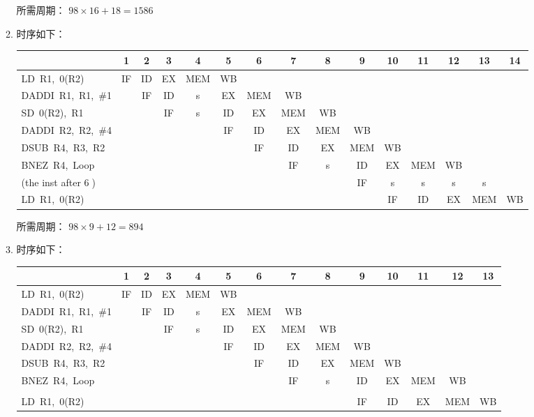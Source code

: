 \documentclass{article}
\begin{document}
\begin{enumerate}[label=\arabic*.]
\begin{enumerate}[label=\alph*.]
            所需周期： $98 \times 16 + 18 = 1586$
            \item 时序如下：\\
            \scalebox{0.8}
            {
                \begin{tabular}{lcccccccccccccc}
                    \hline
                    & 1 & 2 & 3 & 4 & 5 & 6 & 7 & 8 & 9 & 10 & 11 & 12 & 13 & 14 \\
                    \hline
                    LD\ R1,\ 0(R2) & IF & ID & EX & MEM & WB &&&&&&&&& \\
                    DADDI\ R1,\ R1,\ \#1 && IF & ID & s & EX & MEM & WB &&&&&&& \\
                    SD\ 0(R2),\ R1 &&& IF & s & ID & EX & MEM & WB &&&&&& \\
                    DADDI\ R2,\ R2,\ \#4 &&&&& IF & ID & EX & MEM & WB &&&&& \\
                    DSUB\ R4,\ R3,\ R2 &&&&&& IF & ID & EX & MEM & WB &&&& \\
                    BNEZ\ R4,\ Loop &&&&&&& IF & s & ID & EX & MEM & WB && \\
                    (the inst after \textcircled{6}) &&&&&&&&& IF & s & s & s & s & \\
                    LD\ R1,\ 0(R2) &&&&&&&&&& IF & ID & EX & MEM & WB \\
                    \hline
                \end{tabular}
            }

            所需周期： $98 \times 9 + 12 = 894$

            \item 时序如下：\\
            \scalebox{0.8}
            {
                \begin{tabular}{lccccccccccccc}
                    \hline
                    & 1 & 2 & 3 & 4 & 5 & 6 & 7 & 8 & 9 & 10 & 11 & 12 & 13 \\
                    \hline
                    LD\ R1,\ 0(R2) & IF & ID & EX & MEM & WB &&&&&&&& \\
                    DADDI\ R1,\ R1,\ \#1 && IF & ID & s & EX & MEM & WB &&&&&& \\
                    SD\ 0(R2),\ R1 &&& IF & s & ID & EX & MEM & WB &&&&& \\
                    DADDI\ R2,\ R2,\ \#4 &&&&& IF & ID & EX & MEM & WB &&&& \\
                    DSUB\ R4,\ R3,\ R2 &&&&&& IF & ID & EX & MEM & WB &&& \\
                    BNEZ\ R4,\ Loop &&&&&&& IF & s & ID & EX & MEM & WB & \\
                    \\
                    LD\ R1,\ 0(R2) &&&&&&&&& IF & ID & EX & MEM & WB \\
                    \hline
                \end{tabular}
            }


\end{enumerate}
\end{enumerate}
\end{document}

